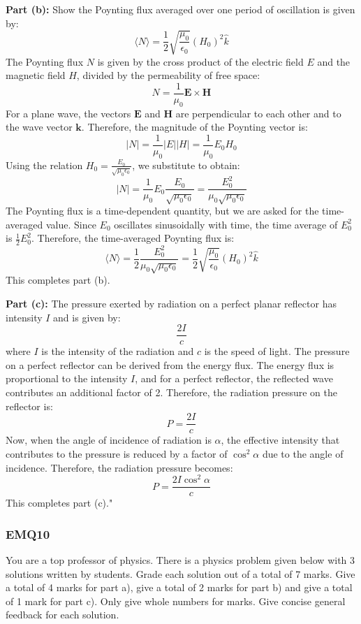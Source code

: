 \textbf{Part (b):} Show the Poynting flux averaged over one period of oscillation is given by:
\[
\langle N \rangle = \frac{1}{2} \sqrt{\frac{\mu_0}{\epsilon_0}} (H_0)^2 \hat{k}
\]
The Poynting flux \( N \) is given by the cross product of the electric field \( E \) and the magnetic field \( H \), divided by the permeability of free space:
\[
N = \frac{1}{\mu_0} \mathbf{E} \times \mathbf{H}
\]
For a plane wave, the vectors \( \mathbf{E} \) and \( \mathbf{H} \) are perpendicular to each other and to the wave vector \( \mathbf{k} \). Therefore, the magnitude of the Poynting vector is:
\[
|N| = \frac{1}{\mu_0} |E| |H| = \frac{1}{\mu_0} E_0 H_0
\]
Using the relation \( H_0 = \frac{E_0}{\sqrt{\mu_0 \epsilon_0}} \), we substitute to obtain:
\[
|N| = \frac{1}{\mu_0} E_0 \frac{E_0}{\sqrt{\mu_0 \epsilon_0}} = \frac{E_0^2}{\mu_0 \sqrt{\mu_0 \epsilon_0}}
\]
The Poynting flux is a time-dependent quantity, but we are asked for the time-averaged value. Since \( E_0 \) oscillates sinusoidally with time, the time average of \( E_0^2 \) is \( \frac{1}{2} E_0^2 \). Therefore, the time-averaged Poynting flux is:
\[
\langle N \rangle = \frac{1}{2} \frac{E_0^2}{\mu_0 \sqrt{\mu_0 \epsilon_0}} = \frac{1}{2} \sqrt{\frac{\mu_0}{\epsilon_0}} (H_0)^2 \hat{k}
\]
This completes part (b).

\textbf{Part (c):} The pressure exerted by radiation on a perfect planar reflector has intensity \( I \) and is given by:
\[
\frac{2I}{c}
\]
where \( I \) is the intensity of the radiation and \( c \) is the speed of light. The pressure on a perfect reflector can be derived from the energy flux. The energy flux is proportional to the intensity \( I \), and for a perfect reflector, the reflected wave contributes an additional factor of 2. Therefore, the radiation pressure on the reflector is:
\[
P = \frac{2I}{c}
\]
Now, when the angle of incidence of radiation is \( \alpha \), the effective intensity that contributes to the pressure is reduced by a factor of \( \cos^2 \alpha \) due to the angle of incidence. Therefore, the radiation pressure becomes:
\[
P = \frac{2I \cos^2 \alpha}{c}
\]
This completes part (c)."

\subsubsection{EMQ10}

You are a top professor of physics. There is a physics problem given below with 3 solutions written by students. Grade each solution out of a total of 7 marks. Give a total of 4 marks for part a), give a total of 2 marks for part b) and give a total of 1 mark for part c). Only give whole numbers for marks. Give concise general feedback for each solution. 

